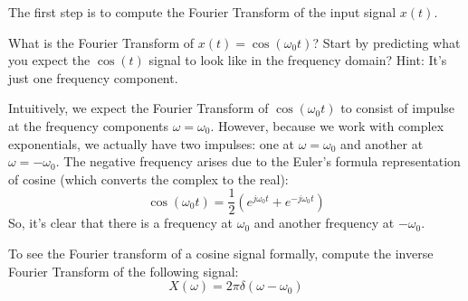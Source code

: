 The first step is to compute the Fourier Transform of the input signal \( x(t) \). 
\begin{popquiz}
    What is the Fourier Transform of \( x(t) = \cos(\omega_0 t) \)? Start by predicting what you expect the $\cos(t)$ signal to look like in the frequency domain? Hint: It's just one frequency component. 

    \popqsplit 
    Intuitively, we expect the Fourier Transform of \( \cos(\omega_0 t) \) to consist of impulse at the frequency components \( \omega = \omega_0 \). However, because we work with complex exponentials, we actually have two impulses: one at \( \omega = \omega_0 \) and another at \( \omega = -\omega_0 \). The negative frequency arises due to the Euler's formula representation of cosine (which converts the complex to the real):
    \[
    \cos(\omega_0 t) = \frac{1}{2} \left( e^{j \omega_0 t} + e^{-j \omega_0 t} \right)
    \]
    So, it's clear that there is a frequency at $\omega_0$ and another frequency at $-\omega_0$.
\end{popquiz}
To see the Fourier transform of a cosine signal formally, compute the inverse Fourier Transform of the following signal:
\[ 
X(\omega) = 2 \pi \delta(\omega - \omega_0)
\]

